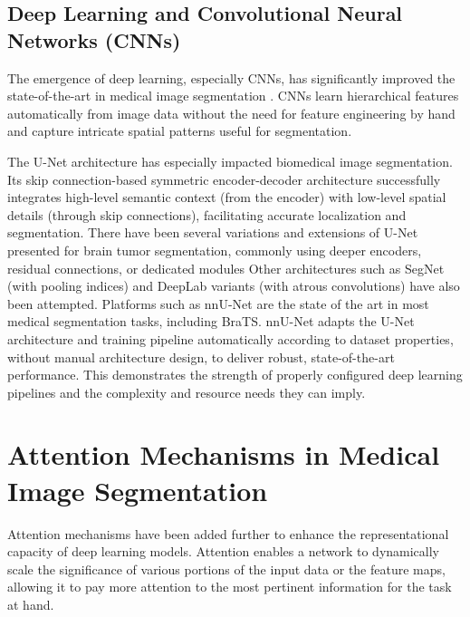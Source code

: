 \subsection{Deep Learning and Convolutional Neural Networks (CNNs)}
The emergence of deep learning, especially CNNs, has significantly improved the state-of-the-art in medical image segmentation \parencite{litjens2017survey, liu2021review, moorthy2022survey}. CNNs learn hierarchical features automatically from image data without the need for feature engineering by hand and capture intricate spatial patterns useful for segmentation.

The U-Net architecture \parencite{ronneberger2015u}  has especially impacted biomedical image segmentation. Its skip connection-based symmetric encoder-decoder architecture successfully integrates high-level semantic context (from the encoder) with low-level spatial details (through skip connections), facilitating accurate localization and segmentation. There have been several variations and extensions of U-Net presented for brain tumor segmentation, commonly using deeper encoders, residual connections, or dedicated modules \parencite{havaei2017brain, cai2022novel, isensee2018brain} Other architectures such as SegNet \parencite{badrinarayanan2017segnet} (with pooling indices) and DeepLab variants \parencite{chen2018encoder} (with atrous convolutions) have also been attempted.
Platforms such as nnU-Net \parencite{isensee2021nnu} are the state of the art in most medical segmentation tasks, including BraTS. nnU-Net adapts the U-Net architecture and training pipeline automatically according to dataset properties, without manual architecture design, to deliver robust, state-of-the-art performance. This demonstrates the strength of properly configured deep learning pipelines and the complexity and resource needs they can imply.

\section{Attention Mechanisms in Medical Image Segmentation}

Attention mechanisms \parencite{vaswani2017attention} have been added further to enhance the representational capacity of deep learning models. Attention enables a network to dynamically scale the significance of various portions of the input data or the feature maps, allowing it to pay more attention to the most pertinent information for the task at hand.

